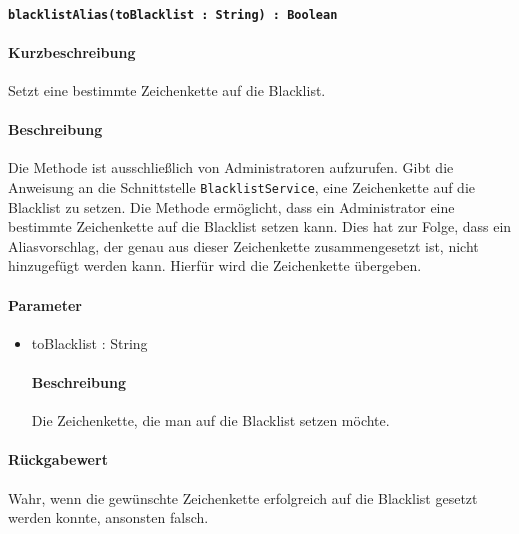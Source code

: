 \paragraph*{\texttt{blacklistAlias(toBlacklist : String) : Boolean}}%
\paragraph*{Kurzbeschreibung}
Setzt eine bestimmte Zeichenkette auf die Blacklist.
\paragraph*{Beschreibung}
Die Methode ist ausschließlich von Administratoren aufzurufen.
Gibt die Anweisung an die Schnittstelle \texttt{BlacklistService}, eine Zeichenkette auf die Blacklist zu setzen.
Die Methode ermöglicht, dass ein Administrator eine bestimmte Zeichenkette auf die Blacklist setzen kann.
Dies hat zur Folge, dass ein Aliasvorschlag, der genau aus dieser Zeichenkette zusammengesetzt ist, nicht hinzugefügt werden kann.
Hierfür wird die Zeichenkette übergeben.
\paragraph*{Parameter}
\begin{itemize}
    \item toBlacklist : String
    		\paragraph*{Beschreibung}
    		Die Zeichenkette, die man auf die Blacklist setzen möchte.
\end{itemize}
\paragraph*{Rückgabewert}
Wahr, wenn die gewünschte Zeichenkette erfolgreich auf die Blacklist gesetzt werden konnte, ansonsten falsch.
